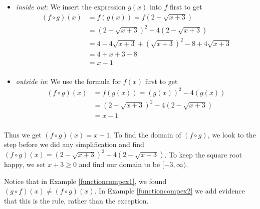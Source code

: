 {\begin{itemize}

\item  \textit{inside out}: We insert the expression $g(x)$ into $f$ first to get  
\begin{align*}
(f \circ g)(x) & =  f(g(x)) = f\left(2-\sqrt{x+3}\right)  \\
 & =  \left(2-\sqrt{x+3}\right)^2 - 4\left(2-\sqrt{x+3}\right)  \\ 
 & =  4 - 4\sqrt{x+3} + \left(\sqrt{x+3}\right)^2 - 8 + 4 \sqrt{x+3}  \\ 
 & =  4 + x+3 - 8  \\ 
 & =  x-1  \\
 \end{align*}

\item  \textit{outside in}:  We use the formula for $f(x)$ first to get
\begin{align*}
(f \circ g)(x) & =  f(g(x)) = \left(g(x)\right)^2 - 4\left(g(x)\right) \\
 & = \left(2-\sqrt{x+3}\right)^2 - 4\left(2-\sqrt{x+3}\right) \\ 
 & =  x-1  \tag*{same algebra as before} \\
 \end{align*}

\end{itemize}

Thus we get $(f \circ g)(x) = x-1$.  To find the domain of $(f \circ g)$, we look to the step before we did any simplification and find $(f \circ g)(x) = \left(2-\sqrt{x+3}\right)^2 - 4\left(2-\sqrt{x+3}\right)$.  To keep the square root happy, we set $x+3 \geq 0$ and find our domain to be $[-3, \infty)$.  
}

\medskip

Notice that in Example \ref{functioncompex1}, we found $(g\circ f)(x)\neq (f\circ g)(x)$. In Example \ref{functioncompex2} we add evidence that this is the rule, rather than the exception.

\medskip

